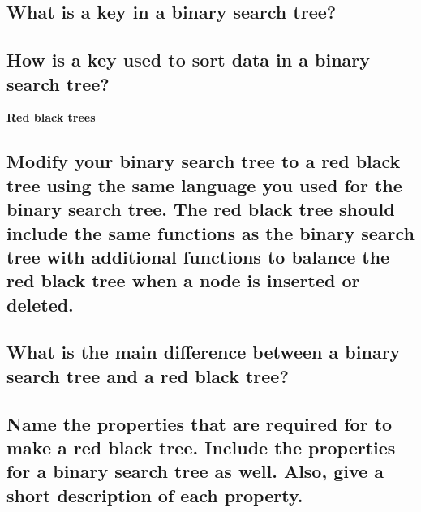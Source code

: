 \documentclass{article}
\begin{document}
\begin{itemize}
\subsection{What is a key in a binary search tree?}

\vspace{108pt}

\subsection{How is a key used to sort data in a binary search tree?}
\pagebreak{}

\begin{Large}
\item{\textbf{Red black trees}}
\end{Large}

\subsection{Modify your binary search tree to a red black tree using the same language you used for the binary search tree. The red black tree should include the same functions as the binary search tree with additional functions to balance the red black tree when a node is inserted or deleted.}

\vspace{24pt}

\subsection{What is the main difference between a binary search tree and a red black tree?}

\vspace{108pt}

\subsection{Name the properties that are required for to make a red black tree. Include the properties for a binary search tree as well. Also, give a short description of each property.}

\pagebreak{}
\end{itemize}
\end{document}
